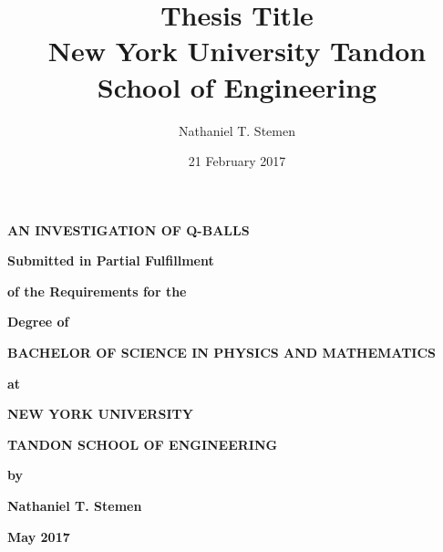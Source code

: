 \documentclass[12pt]{report}
\title{%
    {Thesis Title}\\
    {\large New York University Tandon School of Engineering}\\
}
\author{Nathaniel T. Stemen}
\date{21 February 2017}
\theoremstyle{definition}
\begin{document}
\begin{center}
\begin{minipage}{0.75\linewidth}
    \centering
    \textbf{\Large{AN INVESTIGATION OF Q-BALLS}} \\ \vspace{1.cm}

    \textbf{Submitted in Partial Fulfillment} \\ \vspace{0.5cm}

    \textbf{of the Requirements for the} \\ \vspace{0.5cm}

    \textbf{Degree of} \\ \vspace{0.75cm}

    \textbf{BACHELOR OF SCIENCE IN PHYSICS AND MATHEMATICS}\\ \vspace{0.75cm}

    \textbf{at} \\ \vspace{0.5cm}

    \textbf{NEW YORK UNIVERSITY} \\ \vspace{0.5cm}

    \textbf{TANDON SCHOOL OF ENGINEERING} \\ \vspace{0.5cm}

    \textbf{by} \\ \vspace{0.5cm}

    \textbf{Nathaniel T. Stemen} \\ \vspace{0.5cm}

    \textbf{May 2017}
\end{minipage}
\end{center}
\clearpage

\newpage
\pagestyle{plain}

\noindent
\end{document}
